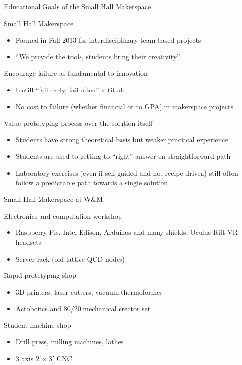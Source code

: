 \documentclass[xcolor=table,compress,professionalfonts,pdfpagelabels]{beamer}
\begin{document}
\begin{frame}{Educational Goals of the Small Hall Makerspace}
 \begin{block}{Small Hall Makerspace}
  \begin{itemize}
   \item Formed in Fall 2013 for interdisciplinary team-based projects 
   \item ``We provide the tools, students bring their creativity''
  \end{itemize}
 \end{block}
 \begin{block}{Encourage failure as fundamental to innovation}
  \begin{itemize}
   \item Instill ``fail early, fail often'' attitude
   \item No cost to failure (whether financial or to GPA) in makerspace projects
  \end{itemize}
 \end{block}
 \begin{block}{Value prototyping process over the solution itself}
  \begin{itemize}
   \item Students have strong theoretical basis but weaker practical experience
   \item Students are used to getting to ``right'' answer on straightforward path
   \item Laboratory exercises (even if self-guided and not recipe-driven) still often follow a predictable path towards a single solution
  \end{itemize}
 \end{block}
\end{frame}

\begin{frame}{Small Hall Makerspace at W\&M}
 \begin{block}{Electronics and computation workshop}
  \begin{itemize}
   \item Raspberry Pis, Intel Edison, Arduinos and many shields, Oculus Rift VR headsets
   \item Server rack (old lattice QCD nodes)
  \end{itemize}
 \end{block}
 \begin{block}{Rapid prototyping shop}
  \begin{itemize}
   \item 3D printers, laser cutters, vacuum thermoformer
   \item Actobotics and 80/20 mechanical erector set
  \end{itemize}
 \end{block}
 \begin{block}{Student machine shop}
  \begin{itemize}
   \item Drill press, milling machines, lathes
   \item 3 axis $2' \times 3'$ CNC
  \end{itemize}
 \end{block}
\end{frame}
\end{document}
